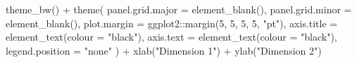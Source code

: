 \documentclass[
  11pt,
  oneside]{book}
\newenvironment{Shaded}{\begin{snugshade}}{\end{snugshade}}
\newcommand{\AttributeTok}[1]{\textcolor[rgb]{0.77,0.63,0.00}{#1}}
\newcommand{\DecValTok}[1]{\textcolor[rgb]{0.00,0.00,0.81}{#1}}
\newcommand{\FunctionTok}[1]{\textcolor[rgb]{0.00,0.00,0.00}{#1}}
\newcommand{\NormalTok}[1]{#1}
\newcommand{\SpecialCharTok}[1]{\textcolor[rgb]{0.00,0.00,0.00}{#1}}
\newcommand{\StringTok}[1]{\textcolor[rgb]{0.31,0.60,0.02}{#1}}
\begin{document}
\begin{Shaded}
\begin{Highlighting}[]
  \FunctionTok{theme\_bw}\NormalTok{() }\SpecialCharTok{+}
  \FunctionTok{theme}\NormalTok{(}
    \AttributeTok{panel.grid.major =} \FunctionTok{element\_blank}\NormalTok{(),}
    \AttributeTok{panel.grid.minor =} \FunctionTok{element\_blank}\NormalTok{(),}
    \AttributeTok{plot.margin =}\NormalTok{ ggplot2}\SpecialCharTok{::}\FunctionTok{margin}\NormalTok{(}\DecValTok{5}\NormalTok{, }\DecValTok{5}\NormalTok{, }\DecValTok{5}\NormalTok{, }\DecValTok{5}\NormalTok{, }\StringTok{"pt"}\NormalTok{),}
    \AttributeTok{axis.title =} \FunctionTok{element\_text}\NormalTok{(}\AttributeTok{colour =} \StringTok{"black"}\NormalTok{),}
    \AttributeTok{axis.text =} \FunctionTok{element\_text}\NormalTok{(}\AttributeTok{colour =} \StringTok{"black"}\NormalTok{),}
    \AttributeTok{legend.position =} \StringTok{"none"}
\NormalTok{  ) }\SpecialCharTok{+}
  \FunctionTok{xlab}\NormalTok{(}\StringTok{"Dimension 1"}\NormalTok{) }\SpecialCharTok{+}
  \FunctionTok{ylab}\NormalTok{(}\StringTok{"Dimension 2"}\NormalTok{)}
\end{Highlighting}
\end{Shaded}
\end{document}
